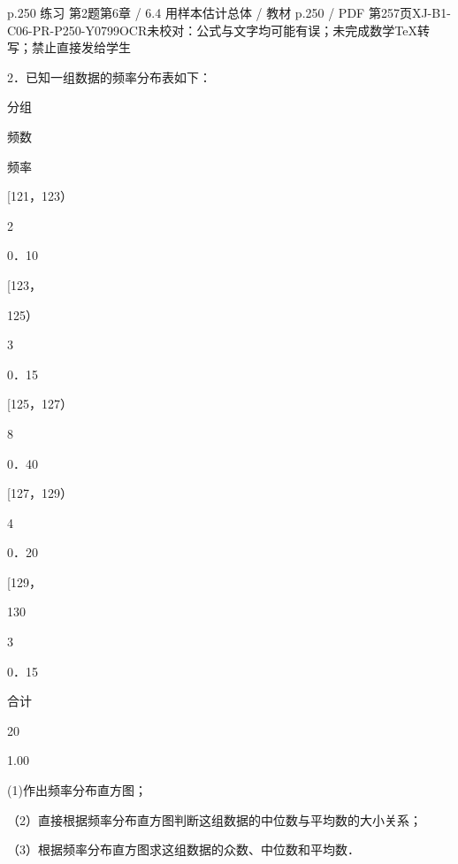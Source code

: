 \begin{bankitem}{p.250 练习 第2题}{第6章 / 6.4 用样本估计总体 / 教材 p.250 / PDF 第257页}{XJ-B1-C06-PR-P250-Y0799}{OCR未校对：公式与文字均可能有误；未完成数学TeX转写；禁止直接发给学生}
\begin{ocrdraft}
\par
2．已知一组数据的频率分布表如下：
\par
分组
\par
频数
\par
频率
\par
[121，123）
\par
2
\par
0．10
\par
[123，
\par
125）
\par
3
\par
0．15
\par
[125，127）
\par
8
\par
0．40
\par
[127，129）
\par
4
\par
0．20
\par
[129，
\par
130
\par
3
\par
0．15
\par
合计
\par
20
\par
1.00
\par
(1)作出频率分布直方图；
\par
（2）直接根据频率分布直方图判断这组数据的中位数与平均数的大小关系；
\par
（3）根据频率分布直方图求这组数据的众数、中位数和平均数．
\end{ocrdraft}
\end{bankitem}

